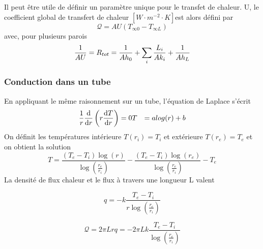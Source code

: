       Il peut être utile de définir un paramètre unique pour le transfet de chaleur. U, le coefficient global de transfert de chaleur $[\si{W \cdot m^{-2} \cdot K}]$est alors défini par
      \begin{equation}
        \mathcal{Q} = AU(T_{\infty 0} - T_{\infty L})
      \end{equation}
      avec, pour plusieurs parois
      \begin{equation}
        \frac{1}{AU} = R_{tot} = \frac{1}{Ah_0} + \sum_i \frac{L_i}{Ak_i} + \frac{1}{Ah_L}
      \end{equation}

      \subsubsection{Conduction dans un tube}
        En appliquant le même raisonnement sur un tube, l'équation de Laplace s'écrit
        \begin{equation}
          \begin{aligned}
            \frac{1}{r}\dv{r}\left(r\dv{T}{r}\right) &= 0
            T &= a log(r) + b
          \end{aligned}
        \end{equation}
        On définit les températures intérieure $T(r_i)= T_i$ et extérieure $T(r_e) = T_e$ et on obtient la solution
        \begin{equation}
          T = \frac{(T_e - T_i) \log(r)}{\log\left(\frac{r_e}{r_i}\right)} - \frac{(T_e - T_i) \log(r_e)}{\log\left(\frac{r_e}{r_i}\right)} - T_e
        \end{equation}
        La densité de flux chaleur et le flux à travers une longueur L valent
        \begin{multicols}{2}
          \begin{equation}
            q = -k \frac{T_e - T_i}{r\log\left(\frac{r_e}{r_i}\right)} \nonumber
          \end{equation}

          \begin{equation}
            \mathcal{Q} = 2\pi Lrq = -2\pi L k \frac{T_e - T_i}{\log\left(\frac{r_e}{r_i}\right)}
          \end{equation}
        \end{multicols}


